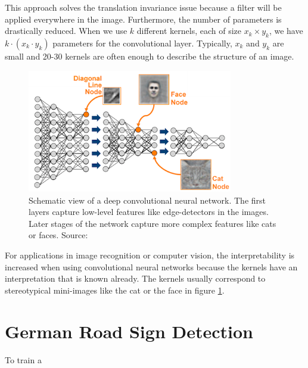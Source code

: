 \documentclass[11pt,a4paper]{article}
\begin{document}
This approach solves the translation invariance issue because a filter will be applied everywhere in the image. Furthermore, the number of parameters is drastically reduced. When we use $k$ different kernels, each of size $x_k \times y_k$, we have $k \cdot (x_k \cdot y_k)$ parameters for the convolutional layer. Typically, $x_k$ and $y_k$ are small and 20-30 kernels are often enough to describe the structure of an image.\\
\begin{figure}[h]
	\includegraphics[width=0.8\textwidth]{deep-learning.png}
	\centering
	\caption[Deep Convolutional Neural Network]{Schematic view of a deep convolutional neural network. The first layers capture low-level features like edge-detectors in the images. Later stages of the network capture more complex features like cats or faces. Source: \cite{deepNetworkImage}}
	\label{fig:deeplearning}
\end{figure}
For applications in image recognition or computer vision, the interpretability is increased when using convolutional neural networks because the kernels have an interpretation that is known already. The kernels usually correspond to stereotypical mini-images like the cat or the face in figure \ref{fig:deeplearning}.

\section{German Road Sign Detection}
To train a 



\end{document}
